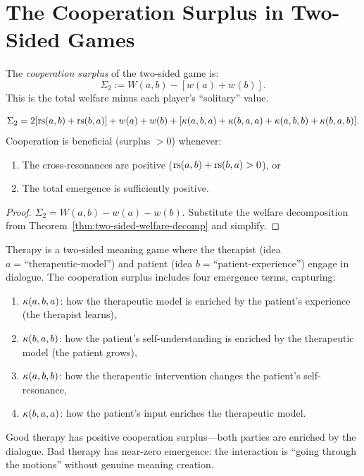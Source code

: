 \section{The Cooperation Surplus in Two-Sided Games}

\begin{definition}
\label{def:coop-surplus-two-sided}
The \emph{cooperation surplus} of the two-sided game is:
\[
\Sigma_2 := W(a, b) - [w(a) + w(b)].
\]
This is the total welfare minus each player's ``solitary'' value.
\end{definition}

\begin{theorem}
\label{thm:coop-surplus-two-sided}
\[
\Sigma_2 = 2[\mathrm{rs}(a, b) + \mathrm{rs}(b, a)] + w(a) + w(b)
+ [\kappa(a,b,a) + \kappa(b,a,a) + \kappa(a,b,b) + \kappa(b,a,b)].
\]
Cooperation is beneficial (surplus $> 0$) whenever:
\begin{enumerate}
\item The cross-resonances are positive ($\mathrm{rs}(a,b) + \mathrm{rs}(b,a) > 0$), or
\item The total emergence is sufficiently positive.
\end{enumerate}
\end{theorem}

\begin{proof}
$\Sigma_2 = W(a,b) - w(a) - w(b)$. Substitute the welfare decomposition
from Theorem~\ref{thm:two-sided-welfare-decomp} and simplify.
\end{proof}

\begin{example}
Therapy is a two-sided meaning game where the therapist (idea $a =
\text{``therapeutic-model''}$) and patient (idea $b =
\text{``patient-experience''}$) engage in dialogue. The cooperation surplus
includes four emergence terms, capturing:
\begin{enumerate}
\item $\kappa(a, b, a)$: how the therapeutic model is enriched by the
patient's experience (the therapist learns),
\item $\kappa(b, a, b)$: how the patient's self-understanding is enriched
by the therapeutic model (the patient grows),
\item $\kappa(a, b, b)$: how the therapeutic intervention changes the
patient's self-resonance,
\item $\kappa(b, a, a)$: how the patient's input enriches the therapeutic
model.
\end{enumerate}
Good therapy has positive cooperation surplus---both parties are enriched by
the dialogue. Bad therapy has near-zero emergence: the interaction is ``going
through the motions'' without genuine meaning creation.
\end{example}


